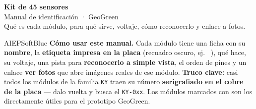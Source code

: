 \documentclass[10pt,letterpaper]{article}
\newcommand{\serig}[1]{%
  \tcbox[on line, colback=AIEPInk, colframe=AIEPInk, boxrule=0pt,
    arc=0.8mm, left=1.6mm, right=1.6mm, top=0.4mm, bottom=0.4mm]%
    {\footnotesize\bfseries\textcolor{white}{\texttt{#1}}}%
}
\newcommand{\geogreen}{%
  \tcbox[on line, colback=AIEPGreen!12, colframe=AIEPGreen, boxrule=0.5pt,
    arc=0.8mm, left=1.6mm, right=1.6mm, top=0.4mm, bottom=0.4mm]%
    {\scriptsize\bfseries\textcolor{AIEPGreen}{\faLeaf\ GeoGreen}}%
}
\renewcommand{\geogreen}{%
  \tcbox[on line, colback=AIEPGreen!12, colframe=AIEPGreen, boxrule=0.5pt,
    arc=0.8mm, left=1.6mm, right=1.6mm, top=0.4mm, bottom=0.4mm]%
    {\scriptsize\bfseries\textcolor{AIEPGreen}{GeoGreen}}%
}
\begin{document}
\begin{tcolorbox}[enhanced, colback=AIEPNavy, colframe=AIEPNavy, arc=0mm,
  boxrule=0pt, left=5mm, right=5mm, top=5mm, bottom=5mm]
{\color{white}\Huge\bfseries Kit de 45 sensores}\\[2mm]
{\color{white}\Large Manual de identificación · GeoGreen}\\[3mm]
{\color{AIEPSoftBlue} Qué es cada módulo, para qué sirve, voltaje, cómo reconocerlo y enlace a fotos.}
\end{tcolorbox}

\begin{infobox}{AIEPSoftBlue}
\textbf{Cómo usar este manual.} Cada módulo tiene una ficha con su \textbf{nombre},
la \textbf{etiqueta impresa en la placa} (recuadro oscuro, ej.\ \serig{KY-018}),
qué hace, su voltaje, una pista para \textbf{reconocerlo a simple vista}, el orden de pines
y un enlace \textcolor{AIEPRed}{\textbf{ver fotos}} que abre imágenes reales de ese módulo.
\textbf{Truco clave:} casi todos los módulos de la familia \texttt{KY} traen su número
\textbf{serigrafiado en el cobre de la placa} — dalo vuelta y busca el \texttt{KY-0xx}.
Los módulos marcados con \geogreen{} son los directamente útiles para el prototipo GeoGreen.
\end{infobox}

\end{document}
